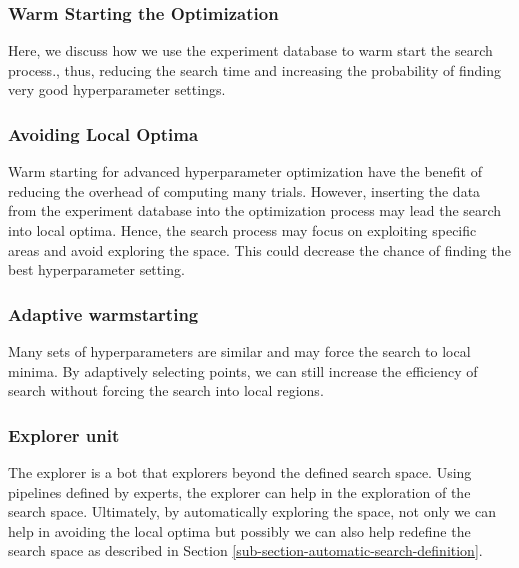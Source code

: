 \subsubsection{Warm Starting the Optimization}
Here, we discuss how we use the experiment database to warm start the search process., thus, reducing the search time and increasing the probability of finding very good hyperparameter settings.

\subsubsection{Avoiding Local Optima}
Warm starting for advanced hyperparameter optimization have the benefit of reducing the overhead of computing many trials.
However, inserting the data from the experiment database into the optimization process may lead the search into local optima.
Hence, the search process may focus on exploiting specific areas and avoid exploring the space.
This could decrease the chance of finding the best hyperparameter setting.


\subsubsection{Adaptive warmstarting}
Many sets of hyperparameters are similar and may force the search to local minima.
By adaptively selecting points, we can still increase the efficiency of search without forcing the search into local regions.

\subsubsection{Explorer unit}
The explorer is a bot that explorers beyond the defined search space.
Using pipelines defined by experts, the explorer can help in the exploration of the search space.
Ultimately, by automatically exploring the space, not only we can help in avoiding the local optima but possibly we can also help redefine the search space as described in Section \ref{sub-section-automatic-search-definition}.


